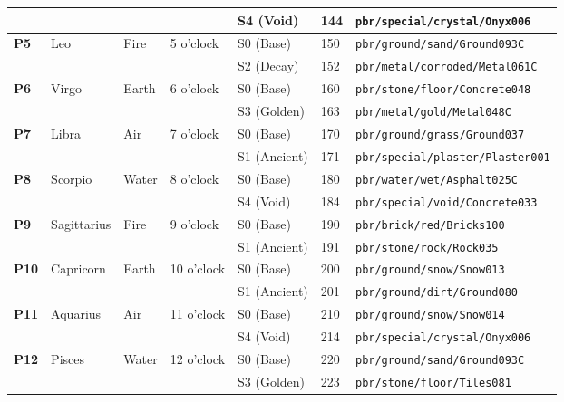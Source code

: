 \documentclass{article}
\begin{document}
\begin{table}[htbp]
\begin{tabular}{@{}lllllll@{}}
            &                 &        &           & S4 (Void) & 144 & \texttt{pbr/special/crystal/Onyx006} \\
\midrule
\textbf{P5} & Leo             & Fire   & 5 o'clock & S0 (Base) & 150 & \texttt{pbr/ground/sand/Ground093C} \\
            &                 &        &           & S2 (Decay)   & 152 & \texttt{pbr/metal/corroded/Metal061C} \\
\midrule
\textbf{P6} & Virgo           & Earth  & 6 o'clock & S0 (Base) & 160 & \texttt{pbr/stone/floor/Concrete048} \\
            &                 &        &           & S3 (Golden)  & 163 & \texttt{pbr/metal/gold/Metal048C} \\
\midrule
\textbf{P7} & Libra           & Air    & 7 o'clock & S0 (Base) & 170 & \texttt{pbr/ground/grass/Ground037} \\
            &                 &        &           & S1 (Ancient) & 171 & \texttt{pbr/special/plaster/Plaster001} \\
\midrule
\textbf{P8} & Scorpio         & Water  & 8 o'clock & S0 (Base) & 180 & \texttt{pbr/water/wet/Asphalt025C} \\
            &                 &        &           & S4 (Void) & 184 & \texttt{pbr/special/void/Concrete033} \\
\midrule
\textbf{P9} & Sagittarius     & Fire   & 9 o'clock & S0 (Base) & 190 & \texttt{pbr/brick/red/Bricks100} \\
            &                 &        &           & S1 (Ancient) & 191 & \texttt{pbr/stone/rock/Rock035} \\
\midrule
\textbf{P10} & Capricorn      & Earth  & 10 o'clock & S0 (Base) & 200 & \texttt{pbr/ground/snow/Snow013} \\
             &                &        &            & S1 (Ancient) & 201 & \texttt{pbr/ground/dirt/Ground080} \\
\midrule
\textbf{P11} & Aquarius       & Air    & 11 o'clock & S0 (Base) & 210 & \texttt{pbr/ground/snow/Snow014} \\
             &                &        &            & S4 (Void)    & 214 & \texttt{pbr/special/crystal/Onyx006} \\
\midrule
\textbf{P12} & Pisces         & Water  & 12 o'clock & S0 (Base) & 220 & \texttt{pbr/ground/sand/Ground093C} \\
             &                &        &            & S3 (Golden)  & 223 & \texttt{pbr/stone/floor/Tiles081} \\
\bottomrule
\end{tabular}
\end{table}
\end{document}
